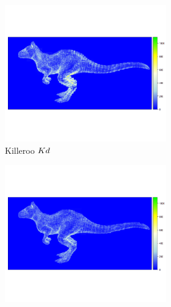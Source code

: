 \begin{figure}
    \begin{subfigure}{0.5\textwidth}
        \centering
        \begin{subfigure}{\textwidth}
            \centering
            \includegraphics[width=1\linewidth]{img/killeroo-kd-heatmap}
            \caption{Killeroo $Kd$}
            \label{fig:killeroo-kd-heatmap}    
        \end{subfigure}
        \begin{subfigure}{\textwidth}
            \centering
            \includegraphics[width=1\linewidth]{img/killeroo-bspize-heatmap}

\end{subfigure}
\end{subfigure}
\end{figure}
